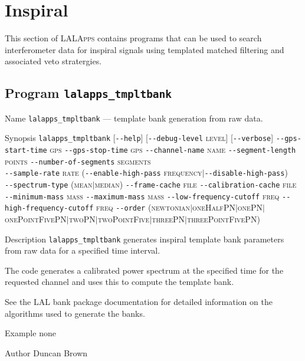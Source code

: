 \section{Inspiral}
\label{secion:inspiral}

This section of \textsc{LALApps} contains programs that can be used to search
interferometer data for inspiral signals using templated matched filtering and
associated veto stratergies.

\clearpage

\subsection{Program \texttt{lalapps\_tmpltbank}}
\label{program:lalapps-tmpltbank}

\begin{entry}

\item[Name]
\verb$lalapps_tmpltbank$ --- template bank generation from raw data.

\item[Synopsis]
\verb$lalapps_tmpltbank$ 
[\verb$--help$]
[\verb$--debug-level$ \textsc{level}]
[\verb$--verbose$]
\verb$--gps-start-time$ \textsc{gps} 
\verb$--gps-stop-time$ \textsc{gps}
\verb$--channel-name$ \textsc{name}
\verb$--segment-length$ \textsc{points}
\verb$--number-of-segments$ \textsc{segments} \\
\verb$--sample-rate$ \textsc{rate}
(\verb$--enable-high-pass$ \textsc{frequency}$|$\verb$--disable-high-pass$) \\
\verb$--spectrum-type$ \textsc{(mean$|$median)}
\verb$--frame-cache$ \textsc{file}
\verb$--calibration-cache$ \textsc{file}
\verb$--minimum-mass$ \textsc{mass}
\verb$--maximum-mass$ \textsc{mass}
\verb$--low-frequency-cutoff$ \textsc{freq}
\verb$--high-frequency-cutoff$ \textsc{freq}
\verb$--order$ 
\textsc{(newtonian$|$oneHalfPN$|$onePN$|$onePointFivePN$|$twoPN$|$twoPointFive$|$threePN$|$threePointFivePN)}

\item[Description]
\verb$lalapps_tmpltbank$ generates inspiral template bank parameters from raw
data for a specified time interval.

The code generates a calibrated power spectrum at the specified time for
the requested channel and uses this to compute the template bank.

See the LAL bank package documentation for detailed information on the
algorithms used to generate the banks.

\item[Example]
none

\item[Author]
Duncan Brown
\end{entry}

